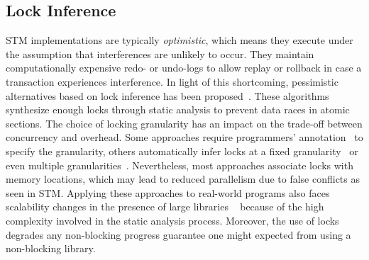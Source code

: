 \documentclass[]{sig-alternate-05-2015}
\begin{document}
\subsection{Lock Inference}
STM implementations are typically \emph{optimistic}, which means they execute under the assumption that interferences are unlikely to occur.
They maintain computationally expensive redo- or undo-logs to allow replay or rollback in case a transaction experiences interference.
In light of this shortcoming, pessimistic alternatives based on lock inference has been proposed~\cite{mccloskey2006autolocker}.
These algorithms synthesize enough locks through static analysis to prevent data races in atomic sections.
The choice of locking granularity has an impact on the trade-off between concurrency and overhead.
Some approaches require programmers' annotation~\cite{golan2013concurrent} to specify the granularity, others automatically infer locks at a fixed granularity~\cite{emmi2007lock} or even multiple granularities~\cite{cherem2008inferring}.
Nevertheless, most approaches associate locks with memory locations, which may lead to reduced parallelism due to false conflicts as seen in STM. 
Applying these approaches to real-world programs also faces scalability changes in the presence of large libraries ~\cite{gudka2012lock} because of the high complexity involved in the static analysis process.
Moreover, the use of locks degrades any non-blocking progress guarantee one might expected from using a non-blocking library.
\end{document}
